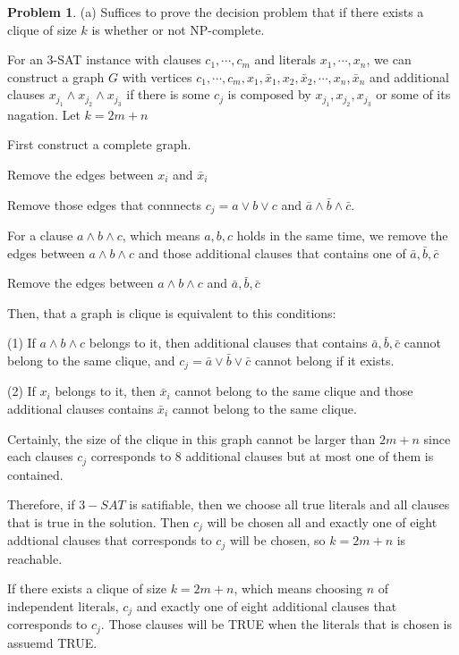 \documentclass[a4paper]{article}
\theoremstyle{definition}
\newtheorem{problem}{Problem}
\theoremstyle{plain}
\numberwithin{equation}{problem}
\begin{document}
\begin{problem}
  (a)  Suffices to prove the decision problem that if there exists a clique of size  $ k $ is whether or not NP-complete.

  For an 3-SAT instance  with clauses  $ c_1,\cdots,c_m $ and literals $ x_1,\cdots,x_n $, we can construct a graph  $ G $ with vertices  $ c_1,\cdots,c_m,x_1,\bar{x}_1,x_2,\bar{x}_2,\cdots,x_n,\bar{x}_n $ and additional clauses  $ x_{j_1}\wedge x_{j_2}\wedge x_{j_3} $ if  there is some  $ c_j $ is composed by $ x_{j_1},x_{j_2},x_{j_3} $ or  some of its nagation.   Let  $ k=2m+n $  
  
  First construct a complete graph. 
  
  Remove the edges between  $ x_i $ and  $ \bar{x}_i $  

  Remove those edges that connnects  $ c_j=a\vee  b\vee c  $ and  $ \bar{a}\wedge \bar{b}\wedge \bar{c} $.

  For a clause  $ a\wedge b\wedge c $, which means  $ a,b,c $ holds in the same time, we remove the edges between  $ a\wedge b\wedge c $ and those additional clauses that contains one of  $ \bar{a},\bar{b},\bar{c}$     

  Remove the edges between  $ a\wedge b\wedge c $ and  $ \bar{a},\bar{b},\bar{c} $  
  
  Then, that a graph is clique is equivalent to this conditions:

  (1) If  $ a\wedge b\wedge c $ belongs to it, then additional clauses that contains  $ \bar{a},\bar{b},\bar{c} $ cannot belong to the same clique, and  $ c_j=\bar{a}\vee \bar{b}\vee\bar{c} $ cannot belong if it exists.
  
  (2) If  $ x_i $ belongs to it, then  $ \bar{x}_i $ cannot belong to the same clique and those additional clauses contains  $ \bar{x}_i $   cannot belong to the same clique.


  Certainly, the size of the clique in this graph cannot be larger than  $ 2m+n $ since each clauses  $ c_j $  corresponds to  $ 8 $ additional clauses but at most one of them is contained. 
   
  Therefore, if  $ 3-SAT $ is satifiable, then we  choose all  true literals and   all clauses that is true in the solution. Then  $ c_j $ will be chosen all and exactly one of eight addtional clauses that corresponds to  $ c_j $ will be chosen, so  $ k=2m+n $ is reachable. 
  
  If  there exists a clique of size  $ k=2m+n $, which means choosing  $ n $ of  independent literals,  $ c_j $ and exactly one of eight additional clauses that corresponds to  $ c_j $. Those clauses will be TRUE when the literals that is chosen is assuemd TRUE.
  

\end{problem}
\end{document}
